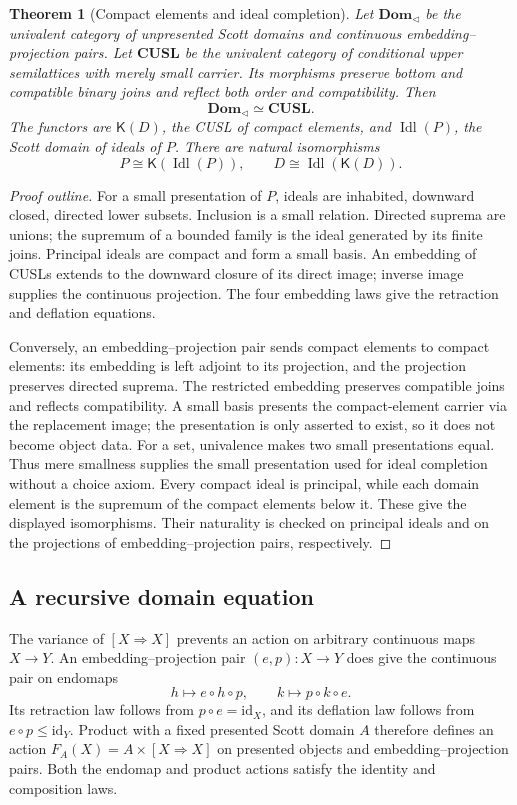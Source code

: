 \documentclass[11pt,a4paper]{article}
\newtheorem{theorem}{Theorem}[section]
\theoremstyle{definition}
\theoremstyle{remark}
\newcommand{\K}{\mathsf K}
\newcommand{\Cont}[2]{[#1\mathbin{\Rightarrow}#2]}
\begin{document}
\begin{theorem}[Compact elements and ideal completion]
\label{thm:cusl-equivalence}
Let $\mathbf{Dom}_{\triangleleft}$ be the univalent category of unpresented
Scott domains and continuous embedding--projection pairs. Let
$\mathbf{CUSL}$ be the univalent category of conditional upper
semilattices with merely small carrier. Its morphisms preserve bottom and
compatible binary joins and reflect both order and compatibility. Then
\[
  \mathbf{Dom}_{\triangleleft}\simeq\mathbf{CUSL}.
\]
The functors are $\K(D)$, the CUSL of compact elements, and
$\operatorname{Idl}(P)$, the Scott domain of ideals of $P$. There are natural
isomorphisms
\[
  P\cong\K(\operatorname{Idl}(P)),\qquad
  D\cong\operatorname{Idl}(\K(D)).
\]
\end{theorem}
\begin{proof}[Proof outline]
For a small presentation of $P$, ideals are inhabited, downward closed,
directed lower subsets. Inclusion is a small relation. Directed suprema
are unions; the supremum of a bounded family is the ideal generated by
its finite joins. Principal ideals are compact and form a small basis.
An embedding of CUSLs extends to the downward closure of its direct image;
inverse image supplies the continuous projection. The four embedding
laws give the retraction and deflation equations.

Conversely, an embedding--projection pair sends compact elements to
compact elements: its embedding is left adjoint to its projection, and the
projection preserves directed suprema. The restricted embedding preserves
compatible joins and reflects compatibility. A small basis presents the
compact-element carrier via the replacement image; the presentation is
only asserted to exist, so it does not become object data.
For a set, univalence makes two small presentations equal. Thus mere
smallness supplies the small presentation used for ideal completion
without a choice axiom. Every compact ideal is principal, while each
domain element is the supremum of the compact elements below it. These
give the displayed isomorphisms. Their naturality is checked on principal
ideals and on the projections of embedding--projection pairs, respectively.
\end{proof}

\subsection{A recursive domain equation}

The variance of $\Cont{X}{X}$ prevents an action on arbitrary continuous
maps $X\to Y$. An embedding--projection pair $(e,p):X\to Y$ does give the
continuous pair on endomaps
\[
 h\longmapsto e\circ h\circ p,
 \qquad k\longmapsto p\circ k\circ e.
\]
Its retraction law follows from $p\circ e=\mathrm{id}_X$, and its
deflation law follows from $e\circ p\leq\mathrm{id}_Y$. Product with a
fixed presented Scott domain $A$ therefore defines an action
$F_A(X)=A\times\Cont{X}{X}$ on presented objects and
embedding--projection pairs. Both the endomap and product actions satisfy
the identity and composition laws.
\end{document}
